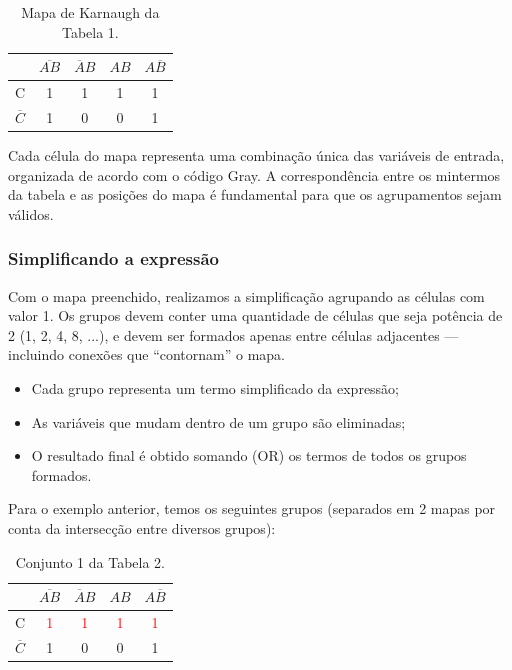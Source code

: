 \documentclass[12pt]{article}
\begin{document}
\begin{table}[H]
\centering
\begin{tabular}{|c|c|c|c|c|}
\hline
 & $\overline{AB}$ & $\overline{A}B$ & $AB$ & $A\overline{B}$ \\
\hline
C & 1 & 1 & 1 & 1 \\
\hline
$\overline{C}$ & 1 & 0 & 0 & 1 \\
\hline
\end{tabular}
\caption{Mapa de Karnaugh da Tabela 1.}
\label{tab:mapa_karnaugh_1}
\end{table}


\begin{tcolorbox}[mynote, title=\textbf{Dica}]
Cada célula do mapa representa uma combinação única das variáveis de entrada, organizada de acordo com o código Gray.  
A correspondência entre os mintermos da tabela e as posições do mapa é fundamental para que os agrupamentos sejam válidos.
\end{tcolorbox}

\subsubsection{Simplificando a expressão}

Com o mapa preenchido, realizamos a simplificação agrupando as células com valor 1.  
Os grupos devem conter uma quantidade de células que seja potência de 2 (1, 2, 4, 8, ...), e devem ser formados apenas entre células adjacentes — incluindo conexões que “contornam” o mapa.

\begin{itemize}
    \item Cada grupo representa um termo simplificado da expressão;
    \item As variáveis que mudam dentro de um grupo são eliminadas;
    \item O resultado final é obtido somando (OR) os termos de todos os grupos formados.
\end{itemize}

Para o exemplo anterior, temos os seguintes grupos (separados em 2 mapas por conta da intersecção entre diversos grupos):

\begin{table}[H]
\centering
\begin{tabular}{|c|c|c|c|c|}
\hline
 & $\overline{AB}$ & $\overline{A}B$ & $AB$ & $A\overline{B}$ \\
\hline
C & \textcolor{red}{1} & \textcolor{red}{1} & \textcolor{red}{1} & \textcolor{red}{1} \\
\hline
$\overline{C}$ & 1 & 0 & 0 & 1 \\
\hline
\end{tabular}
\caption{Conjunto 1 da Tabela 2.}
\end{table}
\end{document}
